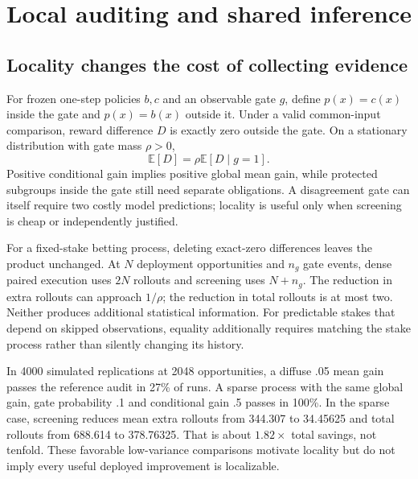 \documentclass[10pt,twocolumn]{article}
\newcommand{\E}{\mathbb{E}}
\begin{document}
\section{Local auditing and shared inference}\label{app:costs}
\subsection{Locality changes the cost of collecting evidence}
For frozen one-step policies $b,c$ and an observable gate $g$, define
$p(x)=c(x)$ inside the gate and $p(x)=b(x)$ outside it. Under a valid common-input
comparison, reward difference $D$ is exactly zero outside the gate. On a
stationary distribution with gate mass $\rho>0$,
\begin{equation}
 \E[D]=\rho\E[D\mid g=1].
\end{equation}
Positive conditional gain implies positive global mean gain, while protected
subgroups inside the gate still need separate obligations. A disagreement gate
can itself require two costly model predictions; locality is useful only when
screening is cheap or independently justified.

For a fixed-stake betting process, deleting exact-zero differences leaves the
product unchanged. At $N$ deployment opportunities and $n_g$ gate events,
dense paired execution uses $2N$ rollouts and screening uses $N+n_g$.
The reduction in extra rollouts can approach $1/\rho$; the reduction in total
rollouts is at most two. Neither produces additional statistical information.
For predictable stakes that depend on skipped observations, equality additionally
requires matching the stake process rather than silently changing its history.

In 4000 simulated replications at 2048 opportunities, a diffuse .05 mean gain
passes the reference audit in 27\% of runs. A sparse process with the same global
gain, gate probability .1 and conditional gain .5 passes in 100\%. In the sparse
case, screening reduces mean extra rollouts from 344.307 to 34.45625 and total
rollouts from 688.614 to 378.76325. That is about $1.82\times$ total savings,
not tenfold. These favorable low-variance comparisons motivate locality but do
not imply every useful deployed improvement is localizable.
\end{document}
